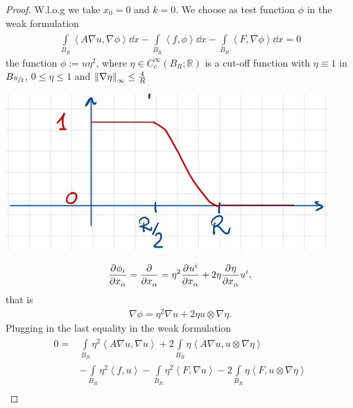\begin{proof}
    W.l.o.g we take \(x_{0}=0\) and \(k=0\). We choose as test function \(\phi \) in the weak formulation
    \begin{gather}
        \int\limits_{B_{R}}^{} \left\langle  A \nabla u, \nabla \phi \right\rangle \dd{x} - \int\limits_{B_{R}}^{} \left\langle  f,\phi \right\rangle \dd{x} -\int\limits_{B_{R}}^{} \left\langle  F,\nabla\phi \right\rangle \dd{x} =0
    \end{gather}
    the function \(\phi:= u \eta^{2}\), where \(\eta \in C_{c}^{\infty}(B_{R}; \mathbb{R})\) is a cut-off function with \(\eta \equiv 1\) in \(B_{\sfrac{R}{2}}\), \(0 \leq \eta \leq 1\) and \(\norm{\nabla \eta}_{\infty} \leq \frac{4}{R}\)
    \begin{center}
        \includegraphics[scale=0.45]{pictures/picture01.png}
    \end{center}
    \begin{gather}
        \pdv[]{\phi_{i}}{x_{\alpha}} = \pdv[]{}{x_{\alpha}} (\eta^{2}u^{2}) = \eta^{2}\pdv[]{u^{i}}{x_{\alpha}}+2 \eta \pdv[]{\eta}{x_{\alpha}} u^{i},
    \end{gather}
    that is 
    \begin{gather}
        \nabla \phi = \eta^{2} \nabla u + 2 \eta u \otimes \nabla \eta.
    \end{gather}
    Plugging in the last equality in the weak formulation
    \begin{align}
        0=& \int\limits_{B_{R}}^{} \eta^{2} \left\langle A \nabla u , \nabla u \right\rangle + 2 \int\limits_{B_{R}}^{} \eta \left\langle A \nabla u , u \otimes \nabla \eta \right\rangle \\
        &- \int\limits_{B_{R}}^{} \eta^{2} \left\langle f, u \right\rangle - \int\limits_{B_{R}}^{} \eta^{2} \left\langle F, \nabla u \right\rangle - 2 \int\limits_{B_{R}}^{} \eta \left\langle  F, u \otimes \nabla \eta \right\rangle \\

\end{align}
\end{proof}

